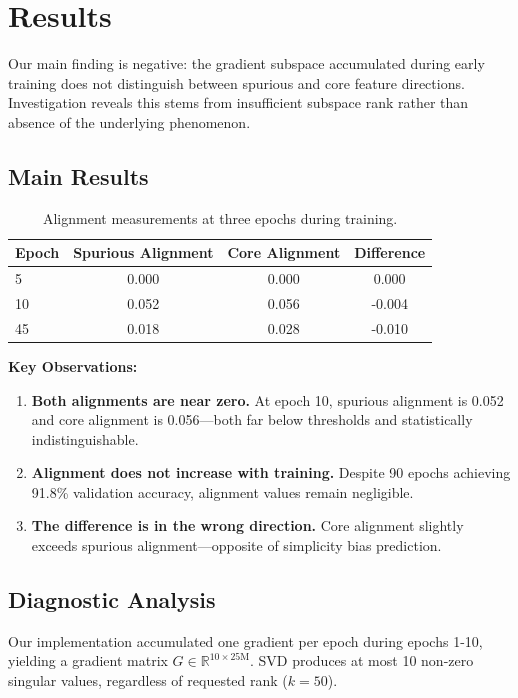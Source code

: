 \section{Results}

Our main finding is negative: the gradient subspace accumulated during early training does not distinguish between spurious and core feature directions. Investigation reveals this stems from insufficient subspace rank rather than absence of the underlying phenomenon.

\subsection{Main Results}

\begin{table}[h]
\centering
\caption{Alignment measurements at three epochs during training.}
\begin{tabular}{@{}lccc@{}}
\toprule
Epoch & Spurious Alignment & Core Alignment & Difference \\
\midrule
5 & 0.000 & 0.000 & 0.000 \\
10 & 0.052 & 0.056 & -0.004 \\
45 & 0.018 & 0.028 & -0.010 \\
\bottomrule
\end{tabular}
\end{table}

\textbf{Key Observations:}

\begin{enumerate}
    \item \textbf{Both alignments are near zero.} At epoch 10, spurious alignment is 0.052 and core alignment is 0.056---both far below thresholds and statistically indistinguishable.
    \item \textbf{Alignment does not increase with training.} Despite 90 epochs achieving 91.8\% validation accuracy, alignment values remain negligible.
    \item \textbf{The difference is in the wrong direction.} Core alignment slightly exceeds spurious alignment---opposite of simplicity bias prediction.
\end{enumerate}

\subsection{Diagnostic Analysis}

Our implementation accumulated one gradient per epoch during epochs 1-10, yielding a gradient matrix $G \in \mathbb{R}^{10 \times 25\text{M}}$. SVD produces at most 10 non-zero singular values, regardless of requested rank ($k=50$).


